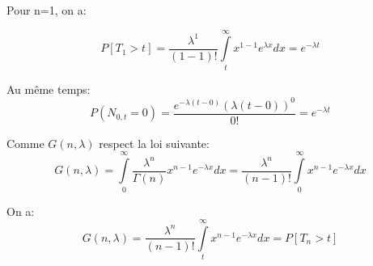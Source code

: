 \documentclass[a4paper]{article}
\begin{document}
Pour n=1, on a:

\begin{equation}
P[T_1 > t] = \frac{\lambda ^1}{(1 - 1)!}\int\limits_t^\infty{x^{1-1}}e^{\lambda x}dx=e^{-\lambda t}
\end{equation}

Au même temps:
\begin{equation}
P(N_{0,t}=0)=\frac{e^{-\lambda (t-0)}(\lambda (t-0))^0}{0!}=e^{-\lambda t} 
\end{equation}

Comme $G(n,\lambda)$ respect la loi suivante:
\begin{equation}
G(n,\lambda)= \int\limits_0^\infty \frac{\lambda^{n}}{\Gamma (n)}x^{n-1}e^{-\lambda x}dx=\frac{\lambda^{n}}{(n-1)!}\int\limits_0^\infty x^{n-1}e^{-\lambda x}dx
\end{equation}

On a:
\begin{equation}
G(n,\lambda)=\frac{\lambda^{n}}{(n-1)!}\int\limits_t^\infty x^{n-1}e^{-\lambda x}dx=P[T_n > t]
\end{equation}

\subsection{}
\subsection{}
\subsection{}
\end{document}
